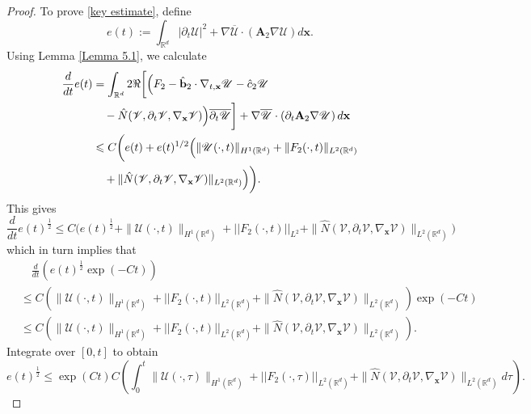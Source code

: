 \documentclass[11pt,reqno,oneside]{amsart}
\numberwithin{equation}{section}
\theoremstyle{definition}
\theoremstyle{remark}
\numberwithin{equation}{section}
\begin{document}
\begin{proof}
		To prove \eqref{key estimate},  define $$
		e(t):=\int_{\mathbb{R}^d}|\partial_{t}\mathscr{U}|^2+\nabla \overline{\mathscr{U}} \cdot (\mathbf{A}_2 \nabla \mathscr{U})d\mathbf{x}
		.
		$$ 
		Using Lemma \ref{Lemma 5.1}, we calculate
		\begin{equation}\label{4.9}
			\begin{aligned}
				\frac{d}{d t}e(t) &=  \int_{\mathbb{R}^d} 2\Re\biggl[ \Bigl( F_2 - \hat{\mathbf{b}}_2 \cdot \nabla_{t,\mathbf{x}} \mathscr{U} - \hat{c}_2 \mathscr{U} \\
				&\quad - \hat{N}(\mathscr{V},\partial_{t}\mathscr{V},\nabla_\mathbf{x}\mathscr{V}) \Bigr) \overline{\partial_t \mathscr{U}} \biggr] 
				+ \nabla \overline{\mathscr{U}} \cdot (\partial_{t}\mathbf{A}_2 \nabla \mathscr{U})  \, d\mathbf{x} \\
				&\leqslant C \biggl( e(t) + e(t)^{1/2} \Bigl( \|\mathscr{U}(\cdot,t)\|_{H^1(\mathbb{R}^d)} + \|F_2(\cdot,t)\|_{L^2(\mathbb{R}^d)} \\
				&\quad + \|\hat{N}(\mathscr{V},\partial_{t}\mathscr{V},\nabla_\mathbf{x}\mathscr{V})\|_{L^2(\mathbb{R}^d)} \Bigr) \biggr).
			\end{aligned}
		\end{equation}
		This gives 
		\begin{equation*}
			\frac{d}{d t}e(t)^{\frac{1}{2}}\leqslant C\bigg(e(t)^{\frac{1}{2}}+\|\mathscr{U}(\cdot,t)\|_{H^1(\mathbb{R}^d)} +||F_2(\cdot,t)||_{L^2}+\|\hat{N}(\mathscr{V},\partial_{t}\mathscr{V},\nabla_\mathbf{x}\mathscr{V})\|_{L^2(\mathbb{R}^d)}\bigg)
		\end{equation*}
		which in turn implies that 
		\begin{equation*}
			\begin{aligned}
				&\quad	\frac{d}{d t}\left(e(t)^{\frac{1}{2}}\exp(-Ct)\right)\\
				&\leqslant C\left(\|\mathscr{U}(\cdot,t)\|_{H^1(\mathbb{R}^d)} +||F_2(\cdot,t)||_{L^2(\mathbb{R}^d)}+\|\hat{N}(\mathscr{V},\partial_{t}\mathscr{V},\nabla_\mathbf{x}\mathscr{V})\|_{L^2(\mathbb{R}^d)}\right)\exp(-Ct)\\
				&\leqslant C\left(\|\mathscr{U}(\cdot,t)\|_{H^1(\mathbb{R}^d)} +||F_2(\cdot,t)||_{L^2(\mathbb{R}^d)}+\|\hat{N}(\mathscr{V},\partial_{t}\mathscr{V},\nabla_\mathbf{x}\mathscr{V})\|_{L^2(\mathbb{R}^d)}\right).
			\end{aligned}
		\end{equation*}
		Integrate over $[0,t]$ to obtain
		\begin{equation*}
			e(t)^{\frac{1}{2}}\leqslant \exp\left(Ct\right)C\left(\int_{0}^{t}\|\mathscr{U}(\cdot,\tau)\|_{H^1(\mathbb{R}^d)} +||F_2(\cdot,\tau)||_{L^2(\mathbb{R}^d)}+\|\hat{N}(\mathscr{V},\partial_{t}\mathscr{V},\nabla_\mathbf{x}\mathscr{V})\|_{L^2(\mathbb{R}^d)}d\tau \right).

\end{equation*}
\end{proof}
\end{document}
